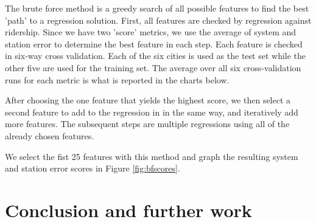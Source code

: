 \documentclass{article}
\begin{document}
The brute force method is a greedy search of all possible features to find the best 'path' to a regression solution. First, all features are checked by regression against ridership. Since we have two 'score' metrics, we use the average of system and station error to determine the best feature in each step. Each feature is checked in six-way cross validation. Each of the six cities is used as the test set while the other five are used for the training set. The average over all six cross-validation runs for each metric is what is reported in the charts below. 

After choosing the one feature that yields the highest score, we then select a second feature to add to the regression in in the same way, and iteratively add more features. The subsequent steps are multiple regressions using all of the already chosen features. 

We select the fist 25 features with this method and graph the resulting system and station error scores in Figure \ref{fig:bfscores}. 

\section{Conclusion and further work}
\end{document}
